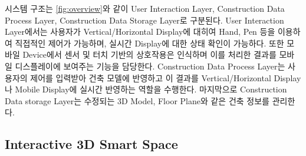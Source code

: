 시스템 구조는 \ref{fig:overview}와 같이 User Interaction Layer, Construction Data Process Layer, Construction Data Storage Layer로 구분된다. User Interaction Layer에서는 사용자가 Vertical/Horizontal Display에 대히여 Hand, Pen 등을 이용하여 직접적인 제어가 가능하며, 실시간 Display에 대한 상태 확인이 가능하다. 또한 모바일 Device에서 센서 및 터치 기반의 상호작용은 인식하며 이를 처리한 결과를 모바일 디스플레이에 보여주는 기능을 담당한다. Construction Data Process Layer는 사용자의 제어를 입력받아 건축 모델에 반영하고 이 결과를 Vertical/Horizontal Display나 Mobile Display에 실시간 반영하는 역할을 수행한다. 마지막으로 Construction Data storage Layer는 수정되는 3D Model, Floor Plane와 같은 건축 정보를 관리한다.

\subsection{Interactive 3D Smart Space}

